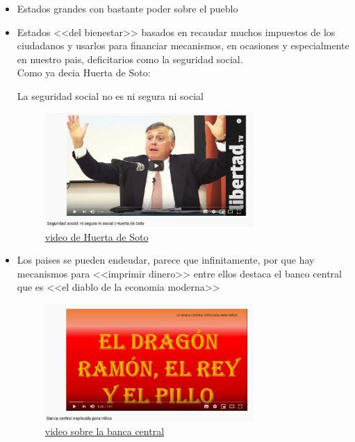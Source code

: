 \begin{itemize}
	\item Estados grandes con bastante poder sobre el pueblo
	\item {Estados <<del bienestar>> basados en recaudar muchos impuestos de los ciudadanos y usarlos para financiar mecanismos, en ocasiones y especialmente en nuestro pais, deficitarios como la seguridad social.\\

		Como ya decia Huerta de Soto: 
		\begin{displayquote}
			La seguridad social no es ni segura ni social
		\end{displayquote}

		\begin{figure}[H]
			\centering
			\includegraphics[width=0.75\textwidth]{figures/seguridad_social.png}
			\caption{\href{https://www.youtube.com/watch?v=NWA4nKAQjR4}{video de Huerta de Soto}}
		\end{figure}
		}
	\item{ Los paises se pueden endeudar, parece que infinitamente, por que hay mecanismos para <<imprimir dinero>>  entre ellos destaca el banco central que es <<el diablo de la economia moderna>> 
		\begin{figure}[H]
			\centering
			\includegraphics[width=0.75\textwidth]{figures/banca_central.png}
			\caption{\href{https://www.youtube.com/watch?v=LNxijjii3eA}{video sobre  la banca central}}
		\end{figure}
		}
\end{itemize}

